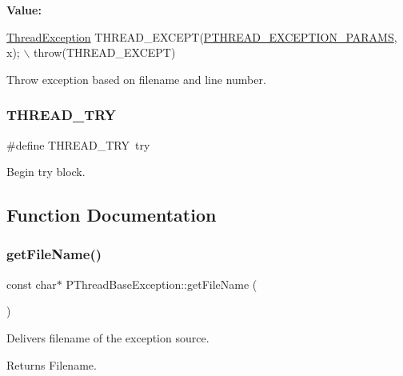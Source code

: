 {\bfseries Value\+:}
\begin{DoxyCode}
\hyperlink{classThreadException}{ThreadException} THREAD\_EXCEPT(\hyperlink{group__EXCEPT__GROUP_gaf6a9cbd32371e5892a6b4190928651dd}{PTHREAD\_EXCEPTION\_PARAMS}, x); \(\backslash\)
    throw(THREAD\_EXCEPT)
\end{DoxyCode}


Throw exception based on filename and line number. 

\mbox{\label{group__EXCEPT__GROUP_ga517202bf1ba7e87014662a560bbcb43c}} 
\subsubsection{\texorpdfstring{T\+H\+R\+E\+A\+D\+\_\+\+T\+RY}{THREAD\_TRY}}
{\footnotesize\ttfamily \#define T\+H\+R\+E\+A\+D\+\_\+\+T\+RY~try}



Begin try block. 



\subsection{Function Documentation}
\mbox{\label{group__EXCEPT__GROUP_ga4d72952887facf12a96971e964d3427b}} 
\subsubsection{\texorpdfstring{get\+File\+Name()}{getFileName()}}
{\footnotesize\ttfamily const char$\ast$ P\+Thread\+Base\+Exception\+::get\+File\+Name (\begin{DoxyParamCaption}{ }\end{DoxyParamCaption})\hspace{0.3cm}{\ttfamily [inline]}}

Delivers filename of the exception source. \begin{DoxyReturn}{Returns}
Filename. 
\end{DoxyReturn}
\mbox{\label{group__EXCEPT__GROUP_ga7a06d992e2dbfa1d283e6c6fb209fd62}} 
